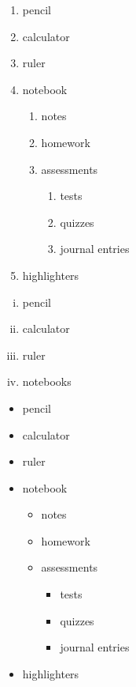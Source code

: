 \documentclass[12pt, a4paper]{article}
\begin{document}
\begin{enumerate}
    \item pencil
    \item calculator
    \item ruler
    \item notebook
        \begin{enumerate}
            \item notes
            \item homework
            \item assessments
            \begin{enumerate}
                \item tests
                \item quizzes
                \item journal entries
            \end{enumerate}
        \end{enumerate}
    \item highlighters
\end{enumerate}

\vspace{0.5cm}

\begin{enumerate}[i.]
    \item pencil
    \item calculator
    \item ruler
    \item notebooks
\end{enumerate}

\vspace{1cm}

\begin{itemize}
    \item pencil
    \item calculator
    \item ruler
    \item notebook
        \begin{itemize}
            \item notes
            \item homework
            \item assessments
            \begin{itemize}
                \item tests
                \item quizzes
                \item journal entries
            \end{itemize}
        \end{itemize}
    \item highlighters
\end{itemize}
\end{document}
